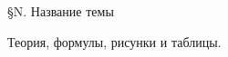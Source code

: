 \documentclass[14pt,a4paper,oneside]{extreport}
\theoremstyle{definition}
\newcommand{\name}[1]{%
  \begin{center}
    \vspace*{0.1cm}
    {\bfseries\fontsize{28}{32}\selectfont
      \parbox{\textwidth}{\centering #1\par}}%
  \end{center}%
}
\begin{document}
\pagestyle{empty}

\name{\S N. Название темы}

Теория, формулы, рисунки и таблицы.
\end{document}
